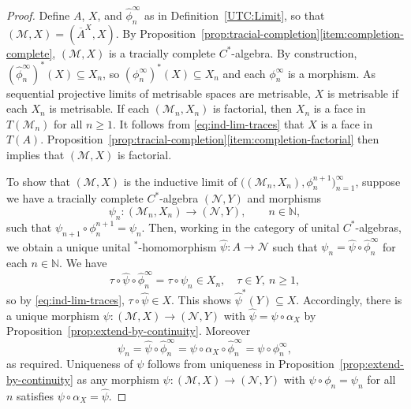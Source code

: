 \documentclass[a4paper,11pt]{amsart}
\theoremstyle{definition}
\numberwithin{equation}{section}
\numberwithin{theorem}{section}
\newcommand{\M}{\mathcal{M}}
\newcommand{\completion}[2]{\overline{#1}^{#2}}
\begin{document}
\begin{proof}
	Define $A$, $X$, and $\hat\phi_n^\infty$ as in Definition~\ref{UTC:Limit}, so that $(\M, X)=(\completion{A}{X}, X)$. By Proposition~\ref{prop:tracial-completion}\ref{item:completion-complete}, $(\M,X)$ is a tracially complete $C^*$-algebra.  By construction, $(\hat\phi_n^\infty)^*(X) \subseteq X_n$, so $(\phi_n^\infty)^*(X)\subseteq X_n$ and each $\phi_n^\infty$ is a morphism.  As sequential projective limits of metrisable spaces are metrisable, $X$ is metrisable if each $X_n$ is metrisable.  If each $(\M_n, X_n)$ is factorial, then $X_n$ is a face in $T(\M_n)$ for all $n \geq 1$.  It follows from \eqref{eq:ind-lim-traces} that $X$ is a face in $T(A)$. Proposition~\ref{prop:tracial-completion}\ref{item:completion-factorial} then implies that $(\M, X)$ is factorial.
	
	To show that $(\M,X)$ is the inductive limit of $\big((\M_n,X_n),\phi_n^{n+1}\big)_{n=1}^\infty$, suppose we have a tracially complete $C^*$-algebra $(\mathcal N,Y)$ and morphisms 
    \begin{equation}
        \psi_n \colon(\M_n,X_n) \to (\mathcal{N},Y), \qquad n \in \mathbb{N},
    \end{equation}
    such that $\psi_{n+1} \circ \phi_n^{n+1} = \psi_n$.  Then, working in the category of unital $C^*$-algebras, we obtain a unique unital $^*$-homomorphism $\hat\psi \colon A \to \mathcal{N}$ such that $\psi_n = \hat{\psi} \circ \hat\phi_n^\infty$ for each $n\in\mathbb N$.  We have
	\begin{equation} \tau \circ \hat\psi \circ \hat\phi_n^\infty = \tau \circ \psi_n \in X_n, \quad \tau \in Y,\ n \geq 1,
    \end{equation}
	so by \eqref{eq:ind-lim-traces}, $\tau \circ \hat\psi \in X$.  This shows $\hat\psi^*(Y) \subseteq X$.  Accordingly, 
	there is a unique morphism $\psi\colon (\M,X)\rightarrow(\mathcal N,Y)$ with $\hat\psi=\psi\circ \alpha_X$ by Proposition~\ref{prop:extend-by-continuity}.
	Moreover
	\begin{equation}
        \psi_n=\hat{\psi}\circ\hat{\phi}_n^\infty=\psi\circ\alpha_X \circ\hat\phi_n^\infty=\psi\circ\phi_n^\infty,
	\end{equation}
	as required.  Uniqueness of $\psi$ follows from uniqueness in Proposition~\ref{prop:extend-by-continuity} as any morphism $\psi\colon (\M,X) \to (\mathcal{N},Y)$ with $\psi\circ\phi_n = \psi_n$ for all $n$ satisfies $\psi\circ\alpha_X = \hat\psi$.
\end{proof}
\end{document}

